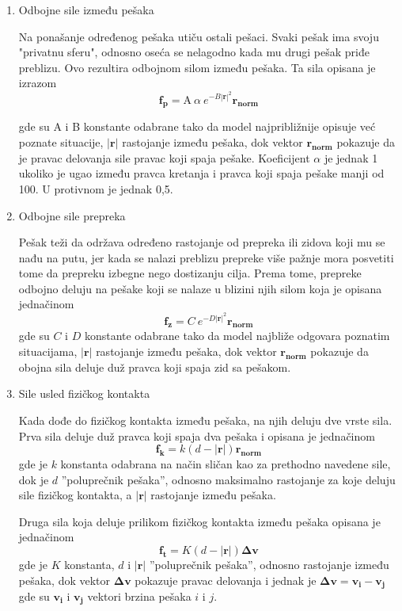 \documentclass[12pt]{article}
\begin{document}
\begin{enumerate}

\item Odbojne sile između pešaka 

Na ponašanje određenog pešaka utiču ostali pešaci. Svaki pešak ima svoju "privatnu sferu", odnosno oseća se nelagodno kada mu drugi pešak priđe preblizu. Ovo rezultira odbojnom silom između pešaka. Ta sila opisana je izrazom
$$
\mathbf{f_{p}}=\mathrm{A}\ \alpha\ e^{-B|\mathbf r|^2}\mathbf{r_{norm}}
$$

gde su A i B konstante odabrane tako da model najpribližnije opisuje već poznate situacije, $|\mathbf r|$ rastojanje između pešaka, dok vektor $\mathbf{r_{norm}}$ pokazuje da je pravac delovanja sile pravac koji spaja pešake. Koeficijent $\alpha$ je jednak 1 ukoliko je ugao između pravca kretanja i pravca koji spaja pešake manji od 100\degree. U protivnom je jednak 0,5.


\item Odbojne sile prepreka

Pešak teži da održava određeno rastojanje od prepreka ili zidova koji mu se nađu na putu, jer kada se nalazi preblizu prepreke više pažnje mora posvetiti tome da prepreku izbegne nego dostizanju cilja. Prema tome, prepreke odbojno deluju na pešake koji se nalaze u blizini njih silom koja je opisana jednačinom
$$
\mathbf{f_{z}}=C\ e^{-D|\mathbf r|^2}\mathbf{r_{norm}}
$$
gde su $C$ i $D$ konstante odabrane tako da model najbliže odgovara poznatim situacijama, $|\mathbf r|$ rastojanje između pešaka, dok vektor $\mathbf{r_{norm}}$ pokazuje da obojna sila deluje duž pravca koji spaja zid sa pešakom. 

\item Sile usled fizičkog kontakta

Kada dođe do fizičkog kontakta između pešaka, na njih deluju dve vrste sila. Prva sila deluje duž pravca koji spaja dva pešaka i opisana je jednačinom
$$
\mathbf{f_k}=k(d-|\mathbf r|)\mathbf{r_{norm}}
$$
gde je $k$ konstanta odabrana na način sličan kao za prethodno navedene sile, dok je $d$ ''poluprečnik pešaka'', odnosno maksimalno rastojanje za koje deluju sile fizičkog kontakta, a $|\mathbf r|$ rastojanje između pešaka.

Druga sila koja deluje prilikom fizičkog kontakta između pešaka opisana je jednačinom
$$
\mathbf{f_t}=K(d-|\mathbf r|)\mathbf{\Delta v}
$$
gde je $K$ konstanta, $d$ i $|\mathbf r|$ ''poluprečnik pešaka'', odnosno rastojanje između pešaka, dok vektor $\mathbf{\Delta v}$ pokazuje pravac delovanja i jednak je $\mathbf{\Delta v}=\mathbf{v_i}-\mathbf{v_j}$ gde su $\mathbf{v_i}$ i $\mathbf{v_j}$ vektori brzina pešaka $i$ i $j$.
\end{enumerate}
\end{document}
